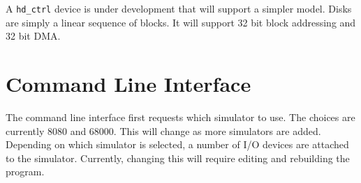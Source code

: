 \documentclass[10pt, openany]{book}
\begin{document}
A \verb|hd_ctrl| device is under development that will support a simpler model.  Disks are simply a linear sequence of blocks.  It will support 32 bit block addressing and 32 bit DMA.

\chapter{Command Line Interface}
The command line interface first requests which simulator to use.  The choices are currently 8080 and 68000.  This will change as more simulators are added.  Depending on which simulator is selected, a number of I/O devices are attached to the simulator.  Currently, changing this will require editing and rebuilding the program.
\end{document}
